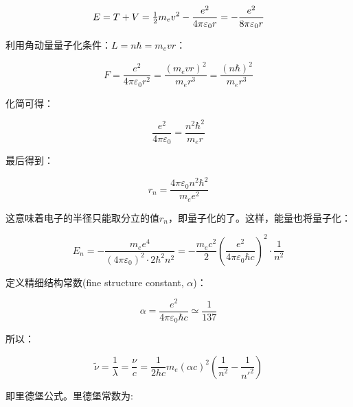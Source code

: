 \begin{equation}
E = T + V = {\textstyle{1 \over 2}}m_e v^2  - \frac{{e^2 }}{{4\pi \varepsilon _0 r}} =  - \frac{{e^2 }}{{8\pi \varepsilon _0 r}}
\end{equation}


利用角动量量子化条件：$L = n\hbar  = m_e vr$：

\begin{equation*}
F = \frac{{e^2 }}{{4\pi \varepsilon _0 r^2 }} = \frac{{(m_e vr)^2 }}{{m_e r^3 }} = \frac{{\left( {n\hbar } \right)^2 }}{{m_e r^3 }}
\end{equation*}

化简可得：

\begin{equation*}
\frac{{e^2 }}{{4\pi \varepsilon _0 }} = \frac{{n^2 \hbar ^2 }}{{m_e r}}
\end{equation*}

最后得到：

\begin{equation}
r_n  = \frac{{4\pi \varepsilon _0 n^2 \hbar ^2 }}{{m_e e^2 }}
\end{equation}

这意味着电子的半径只能取分立的值$r_n$，即量子化的了。这样，能量也将量子化：

\begin{equation}
E_n  =  - \frac{{m_e e^4 }}{{\left( {4\pi \varepsilon _0 } \right)^2  \cdot 2\hbar ^2 n^2 }} =  - \frac{{m_e c^2 }}{2}\left( {\frac{{e^2 }}{{4\pi \varepsilon _0 \hbar c}}} \right)^2  \cdot \frac{1}{{n^2 }}
\end{equation}


定义精细结构常数(fine structure constant, $\alpha$)：

\begin{equation}
\alpha = \frac{{e^2 }}{{4\pi \varepsilon _0 \hbar c}} \simeq
\frac{1}{{137}}
\end{equation}

所以：

\begin{equation}
\tilde \nu  = \frac{1}{\lambda } = \frac{\nu }{c} = \frac{1}{{2hc}}m_e \left( {\alpha c} \right)^2 \left( {\frac{1}{{n^2 }} - \frac{1}{{n'^2 }}} \right)
\end{equation}

即里德堡公式。里德堡常数为: 


